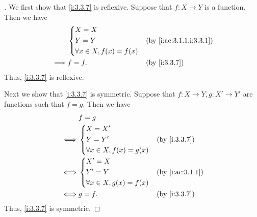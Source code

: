 \begin{proof}[]
  We first show that \cref{i:3.3.7} is reflexive.
  Suppose that \(f : X \to Y\) is a function.
  Then we have
  \begin{align*}
             & \begin{dcases}
                 X = X \\
                 Y = Y \\
                 \forall x \in X, f(x) = f(x)
               \end{dcases} &  & \by{i:ac:3.1.1,i:3.3.1}      \\
    \implies & f = f.                       &  & \by{i:3.3.7}
  \end{align*}
  Thus, \cref{i:3.3.7} is reflexive.

  Next we show that \cref{i:3.3.7} is symmetric.
  Suppose that \(f : X \to Y, g : X' \to Y'\) are functions such that \(f = g\).
  Then we have
  \begin{align*}
         & f = g                                          \\
    \iff & \begin{dcases}
             X = X' \\
             Y = Y' \\
             \forall x \in X, f(x) = g(x)
           \end{dcases} &  & \by{i:3.3.7}                 \\
    \iff & \begin{dcases}
             X' = X \\
             Y' = Y \\
             \forall x \in X, g(x) = f(x)
           \end{dcases} &  & \by{i:ac:3.1.1}              \\
    \iff & g = f.                       &  & \by{i:3.3.7}
  \end{align*}
  Thus, \cref{i:3.3.7} is symmetric.


\end{proof}
